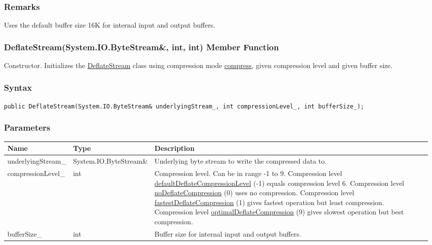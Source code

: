 \documentclass[a4paper,oneside,11.000000pt]{book}
\begin{document}
\subsubsection*{Remarks}
\begin{flushleft}
Uses the default buffer size 16K for internal input and output buffers.

\end{flushleft}
\clearpage

\hypertarget{System.IO.Compression.DeflateStream.constructor.P.System.IO.Compression.DeflateStream.R.System.IO.ByteStream.int.int}{\subsubsection*{DeflateStream(System.IO.ByteStream\&, int, int) Member Function}}
\begin{flushleft}
Constructor. Initializes the \hyperlink{System.IO.Compression.DeflateStream}{DeflateStream} class using compression mode \hyperlink{System.IO.Compression.CompressionMode.compress}{compress}, given compression level and
given buffer size.

\end{flushleft}
\subsubsection*{Syntax}
\texttt{public DeflateStream(System.IO.ByteStream\& underlyingStream\_, int compressionLevel\_, int bufferSize\_);}
\subsubsection*{Parameters}
\begin{flushleft}
\begin{supertabular}[l]{!{\raggedright}p{4.10323cm}!{\raggedright}p{5.76344cm}!{\raggedright}p{4.93333cm}}
\textbf{Name}
& \textbf{Type}
& \textbf{Description}
\\
\hline
underlyingStream\_
& System.\-IO.\-ByteStream\&\-
& Underlying byte stream to write the compressed data to.

\\
compressionLevel\_
& int
& Compression level. Can be in range -1 to 9.
Compression level \hyperlink{System.IO.Compression.defaultDeflateCompressionLevel}{defaultDeflateCompressionLevel} (-1) equals compression level 6.
Compression level \hyperlink{System.IO.Compression.noDeflateCompression}{noDeflateCompression} (0) uses no compression.
Compression level \hyperlink{System.IO.Compression.fastestDeflateCompression}{fastestDeflateCompression} (1) gives fastest operation but least compression.
Compression level \hyperlink{System.IO.Compression.optimalDeflateCompression}{optimalDeflateCompression} (9) gives slowest operation but best compression.

\\
bufferSize\_
& int
& Buffer size for internal input and output buffers.

\\
\end{supertabular}

\end{flushleft}
\clearpage
\end{document}
